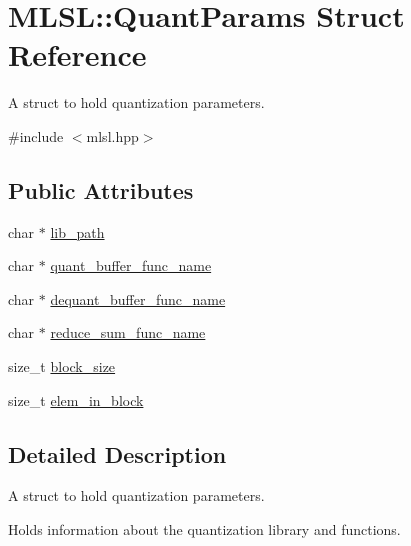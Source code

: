 \hypertarget{structMLSL_1_1QuantParams}{\section{M\-L\-S\-L\-:\-:Quant\-Params Struct Reference}
\label{structMLSL_1_1QuantParams}
}


A struct to hold quantization parameters.  




{\ttfamily \#include $<$mlsl.\-hpp$>$}

\subsection*{Public Attributes}
\begin{DoxyCompactItemize}
\item 
char $\ast$ \hyperlink{structMLSL_1_1QuantParams_a124d9ee5323d9dccdbabb031d5464c3a}{lib\-\_\-path}
\item 
char $\ast$ \hyperlink{structMLSL_1_1QuantParams_a350a858ed5502252435fa7608edda416}{quant\-\_\-buffer\-\_\-func\-\_\-name}
\item 
char $\ast$ \hyperlink{structMLSL_1_1QuantParams_ac8f95f6abe7e8f117e85a90265cc420f}{dequant\-\_\-buffer\-\_\-func\-\_\-name}
\item 
char $\ast$ \hyperlink{structMLSL_1_1QuantParams_a25df9562472e1ff98079a8943667d157}{reduce\-\_\-sum\-\_\-func\-\_\-name}
\item 
size\-\_\-t \hyperlink{structMLSL_1_1QuantParams_a9a384f669eae7ed99707f5a56c0cf9f3}{block\-\_\-size}
\item 
size\-\_\-t \hyperlink{structMLSL_1_1QuantParams_ad0e8588ca701c062f8a96cbf235c5d18}{elem\-\_\-in\-\_\-block}
\end{DoxyCompactItemize}


\subsection{Detailed Description}
A struct to hold quantization parameters. 

Holds information about the quantization library and functions. 

